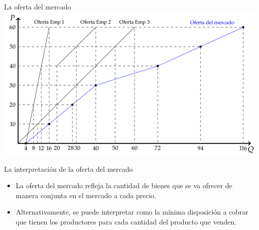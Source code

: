 \documentclass{beamer}
\begin{document}
\begin{frame}{La oferta del mercado}
    \centering
    \includegraphics[scale=0.5]{../Figures/C14.1.png}
\end{frame}

\begin{frame}{La interpretación de la oferta del mercado}
    \begin{itemize}
        \item La oferta del mercado refleja la cantidad de bienes que se va ofrecer de manera conjunta en el mercado a cada precio.
        \item Alternativamente, se puede interpretar como la mínima disposición a cobrar que tienen los productores para cada cantidad del producto que venden.
    \end{itemize}
    \begin{center}
    \end{center}
\end{frame}
\end{document}
